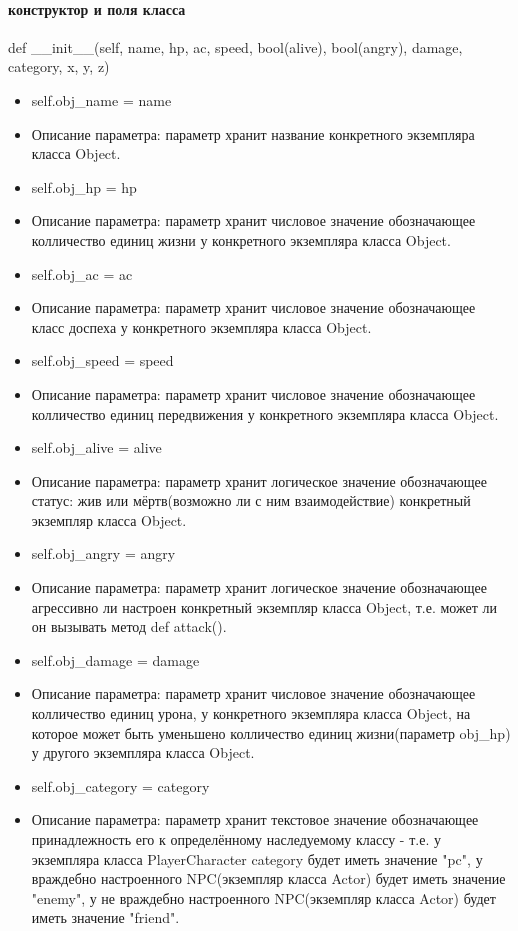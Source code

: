 \paragraph{конструктор и поля класса}
def \_\_init\_\_(self, name, hp, ac, speed, bool(alive), bool(angry), damage, category, x, y, z)
\begin{itemize}
	\item self.obj\_name = name 
	\item Описание параметра: параметр хранит название конкретного экземпляра класса Object.
	\item self.obj\_hp = hp 
	\item Описание параметра: параметр хранит числовое значение обозначающее колличество единиц жизни у конкретного экземпляра класса Object.
	\item self.obj\_ac = ac
	\item Описание параметра: параметр хранит числовое значение обозначающее класс доспеха у конкретного экземпляра класса Object.
	\item self.obj\_speed = speed 
	\item Описание параметра: параметр хранит числовое значение обозначающее колличество единиц передвижения у конкретного экземпляра класса Object.
	\item self.obj\_alive = alive 
	\item Описание параметра: параметр хранит логическое значение обозначающее статус: жив или мёртв(возможно ли с ним взаимодействие) конкретный экземпляр класса Object.
	\item self.obj\_angry = angry 
	\item Описание параметра: параметр хранит логическое значение обозначающее агрессивно ли настроен конкретный экземпляр класса Object, т.е. может ли он вызывать метод def attack().
	\item self.obj\_damage = damage
	\item Описание параметра: параметр хранит числовое значение обозначающее колличество единиц урона, у конкретного экземпляра класса Object, на которое может быть уменьшено колличество единиц жизни(параметр obj\_hp) у другого экземпляра класса Object.
	\item self.obj\_category = category 
	\item Описание параметра: параметр хранит текстовое значение обозначающее принадлежность его к определённому наследуемому классу - т.е. у экземпляра класса PlayerCharacter category будет иметь значение "pc", у враждебно настроенного NPC(экземпляр класса Actor) будет иметь значение "enemy", у не враждебно настроенного NPC(экземпляр класса Actor) будет иметь значение "friend".

\end{itemize}
